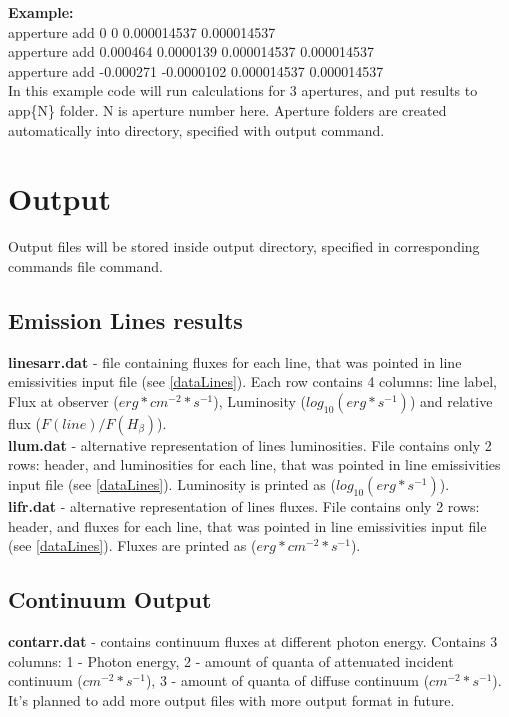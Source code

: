\documentclass[a4paper]{article}
\begin{document}
{\bf Example:}\\
apperture add 0 0 0.000014537 0.000014537\\
apperture add 0.000464 0.0000139 0.000014537 0.000014537\\
apperture add -0.000271 -0.0000102 0.000014537 0.000014537\\
In this example code will run calculations for 3 apertures, and put results to 
app\{N\} folder. N is aperture number here. Aperture folders are created automatically
into directory, specified with output command.

\section{Output}
Output files will be stored inside output directory, specified in corresponding commands file command.

\subsection{Emission Lines results}
{\bf linesarr.dat} - file containing fluxes for each line, that was pointed in line emissivities input file (see \ref{dataLines}).
Each row contains 4 columns: line label, Flux at observer ($erg * cm^{-2} * s^{-1}$), Luminosity ($log_{10}(erg*s^{-1})$)
and relative flux ($F(line)/F(H_{\beta})$).\\
{\bf llum.dat} - alternative representation of lines luminosities. File contains only 2 rows: header, and luminosities for each line, that was pointed in line emissivities input file (see \ref{dataLines}).
Luminosity is printed as ($log_{10}(erg*s^{-1})$). \\
{\bf lifr.dat} - alternative representation of lines fluxes. File contains only 2 rows: header, and fluxes for each line, that was pointed in line emissivities input file (see \ref{dataLines}).
Fluxes are printed as ($erg * cm^{-2} * s^{-1}$).

\subsection{Continuum Output}
{\bf contarr.dat} - contains continuum fluxes at different photon energy. Contains 3 columns:
1 - Photon energy, 2 - amount of quanta of attenuated incident continuum ($cm^{-2}*s^{-1}$), 3 - amount of quanta of diffuse continuum ($cm^{-2}*s^{-1}$).\\

It's planned to add more output files with more output format in future.
\end{document}
